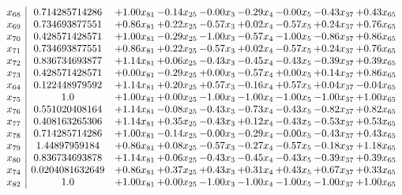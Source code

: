 \documentclass[8pt]{article}
\begin{document}
\[\begin{array}{c| c c@{\hskip 2pt} c@{\hskip 2pt} c@{\hskip 2pt} c@{\hskip 2pt} c@{\hskip 2pt} c@{\hskip 2pt} c@{\hskip 2pt} }
 x_{68}   &  0.714285714286 & +  1.00 x_{81} & -0.14 x_{25} & -0.00 x_{3} & -0.29 x_{4} & -0.00 x_{5} & -0.43 x_{37} & +  0.43 x_{65}\\
 x_{69}   &  0.734693877551 & +  0.86 x_{81} & +  0.22 x_{25} & -0.57 x_{3} & +  0.02 x_{4} & -0.57 x_{5} & +  0.24 x_{37} & +  0.76 x_{65}\\
 x_{70}   &  0.428571428571 & +  1.00 x_{81} & -0.29 x_{25} & -1.00 x_{3} & -0.57 x_{4} & -1.00 x_{5} & -0.86 x_{37} & +  0.86 x_{65}\\
 x_{71}   &  0.734693877551 & +  0.86 x_{81} & +  0.22 x_{25} & -0.57 x_{3} & +  0.02 x_{4} & -0.57 x_{5} & +  0.24 x_{37} & +  0.76 x_{65}\\
 x_{72}   &  0.836734693877 & +  1.14 x_{81} & +  0.06 x_{25} & -0.43 x_{3} & -0.45 x_{4} & -0.43 x_{5} & -0.39 x_{37} & +  0.39 x_{65}\\
 x_{73}   &  0.428571428571 & +  0.00 x_{81} & -0.29 x_{25} & +  0.00 x_{3} & -0.57 x_{4} & +  0.00 x_{5} & +  0.14 x_{37} & +  0.86 x_{65}\\
 x_{64}   &  0.122448979592 & +  1.14 x_{81} & +  0.20 x_{25} & +  0.57 x_{3} & -0.16 x_{4} & +  0.57 x_{5} & +  0.04 x_{37} & -0.04 x_{65}\\
 x_{75}   &  1.0 & +  1.00 x_{81} & +  0.00 x_{25} & -1.00 x_{3} & -1.00 x_{4} & -1.00 x_{5} & -1.00 x_{37} & +  1.00 x_{65}\\
 x_{76}   &  0.551020408164 & +  1.14 x_{81} & -0.08 x_{25} & -0.43 x_{3} & -0.73 x_{4} & -0.43 x_{5} & -0.82 x_{37} & +  0.82 x_{65}\\
 x_{77}   &  0.408163265306 & +  1.14 x_{81} & +  0.35 x_{25} & -0.43 x_{3} & +  0.12 x_{4} & -0.43 x_{5} & -0.53 x_{37} & +  0.53 x_{65}\\
 x_{78}   &  0.714285714286 & +  1.00 x_{81} & -0.14 x_{25} & -0.00 x_{3} & -0.29 x_{4} & -0.00 x_{5} & -0.43 x_{37} & +  0.43 x_{65}\\
 x_{79}   &  1.44897959184 & +  0.86 x_{81} & +  0.08 x_{25} & -0.57 x_{3} & -0.27 x_{4} & -0.57 x_{5} & -0.18 x_{37} & +  1.18 x_{65}\\
 x_{80}   &  0.836734693878 & +  1.14 x_{81} & +  0.06 x_{25} & -0.43 x_{3} & -0.45 x_{4} & -0.43 x_{5} & -0.39 x_{37} & +  0.39 x_{65}\\
 x_{74}   &  0.0204081632649 & +  0.86 x_{81} & +  0.37 x_{25} & +  0.43 x_{3} & +  0.31 x_{4} & +  0.43 x_{5} & +  0.67 x_{37} & +  0.33 x_{65}\\
 x_{82}   &  1.0 & +  1.00 x_{81} & +  0.00 x_{25} & -1.00 x_{3} & -1.00 x_{4} & -1.00 x_{5} & -1.00 x_{37} & +  1.00 x_{65}\\

\end{array}\]
\end{document}
